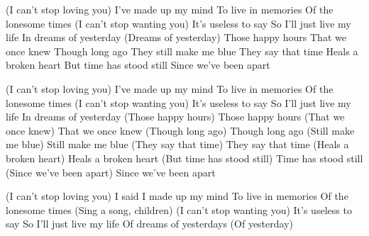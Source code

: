 (I can't stop loving you)
I've made up my mind
To live in memories
Of the lonesome times
(I can't stop wanting you)
It's useless to say
So I'll just live my life
In dreams of yesterday
(Dreams of yesterday)
Those happy hours 
That we once knew
Though long ago
They still make me blue
They say that time
Heals a broken heart
But time has stood still 
Since we've been apart

(I can't stop loving you)
I've made up my mind
To live in memories
Of the lonesome times
(I can't stop wanting you)
It's useless to say
So I'll just live my life
In dreams of yesterday
(Those happy hours)
Those happy hours
(That we once knew)
That we once knew
(Though long ago)
Though long ago
(Still make me blue)
Still make me blue
(They say that time)
They say that time
(Heals a broken heart)
Heals a broken heart
(But time has stood still)
Time has stood still
(Since we've been apart)
Since we've been apart

(I can't stop loving you)
I said I made up my mind
To live in memories
Of the lonesome times
(Sing a song, children)
(I can't stop wanting you)
It's useless to say
So I'll just live my life
Of dreams of yesterdays
(Of yesterday)